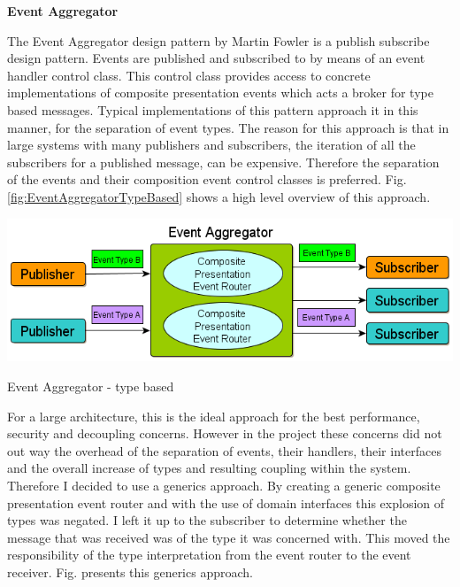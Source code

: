 \newpage
	
		\large{\bfseries{Event Aggregator}}
		
		\normalsize
		{
			The Event Aggregator design pattern by Martin Fowler is a publish subscribe design pattern.  Events are published 
			and subscribed to by means of an event handler control class.  This control class provides access to concrete implementations
			of composite presentation events which acts a broker for type based messages.
			\newline
			\newline
			Typical implementations of this pattern approach it in this manner, for the separation of event types.  
			The reason for this approach is that in large systems with many publishers and subscribers, the iteration of all the subscribers 
			for a published message, can be expensive.  Therefore the separation of the events and their composition event control classes is preferred.
			Fig. \ref{fig:EventAggregatorTypeBased} shows a high level overview of this approach.
			\newline
		}
		
		\begin{figurehere}
			\centering
			\includegraphics[scale=0.68]{pages/chapter3/figures/ean.png}
			\caption{Event Aggregator - type based}
			\label{fig:EventAggregatorTypeBased}
		\end{figurehere}
		
		\vspace{5mm}
		\normalsize
		{
			For a large architecture, this is the ideal approach for the best performance, security and decoupling concerns.
			However in the project these concerns did not out way the overhead of the separation of events, their handlers, their interfaces
			and the overall increase of types and resulting coupling within the system.  Therefore I decided to use a generics approach.
			By creating a generic composite presentation event router and with the use of domain interfaces this explosion of types
			was negated.  I left it up to the subscriber to determine whether the message that was received was of the type it was concerned with.
			This moved the responsibility of the type interpretation from the event router to the event receiver.	Fig. \label{fig:EventAggregatorGenericBased}
			presents this generics approach.
			\newline
		}
		
